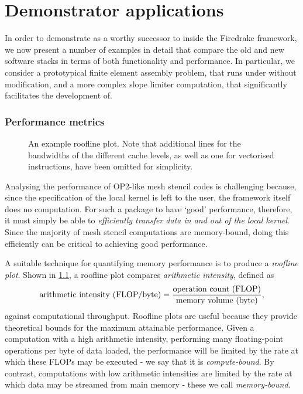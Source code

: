 \documentclass[thesis]{subfiles}
\begin{document}
\chapter{Demonstrator applications}
\label{chapter:demonstrator_applications}

In order to demonstrate  as a worthy successor to  inside the Firedrake framework, we now present a number of examples in detail that compare the old and new software stacks in terms of both functionality and performance.
In particular, we consider a prototypical finite element assembly problem, that runs under  without modification, and a more complex slope limiter computation, that  significantly facilitates the development of.

\subsection{Performance metrics}

\begin{figure}
  \centering
  
  \caption{
    An example roofline plot.
    Note that additional lines for the bandwidths of the different cache levels, as well as one for vectorised instructions, have been omitted for simplicity.
  }
  \label{fig:roofline}
\end{figure}

Analysing the performance of OP2-like mesh stencil codes is challenging because, since the specification of the local kernel is left to the user, the framework itself does no computation.
For such a package to have `good' performance, therefore, it must simply be able to \emph{efficiently transfer data in and out of the local kernel}.
Since the majority of mesh stencil computations are memory-bound, doing this efficiently can be critical to achieving good performance.

A suitable technique for quantifying memory performance is to produce a \emph{roofline plot}.
Shown in \cref{fig:roofline}, a roofline plot compares \emph{arithmetic intensity}, defined as
\begin{equation}
  \textnormal{arithmetic intensity (FLOP/byte)} = \frac{\textnormal{operation count (FLOP)}}{\textnormal{memory volume (byte)}},
\end{equation}
against computational throughput.
Roofline plots are useful because they provide theoretical bounds for the maximum attainable performance.
Given a computation with a high arithmetic intensity, performing many floating-point operations per byte of data loaded, the performance will be limited by the rate at which these FLOPs may be executed - we say that it is \emph{compute-bound}.
By contrast, computations with low arithmetic intensities are limited by the rate at which data may be streamed from main memory - these we call \emph{memory-bound}.
\end{document}
